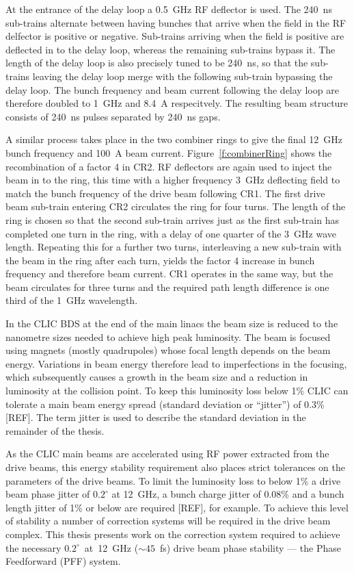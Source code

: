 At the entrance of the delay loop a 0.5~GHz RF deflector is used. The 240~ns sub-trains alternate between having bunches that arrive when the field in the RF delfector is positive or negative. Sub-trains arriving when the field is positive are deflected in to the delay loop, whereas the remaining sub-trains bypass it. The length of the delay loop is also precisely tuned to be 240~ns, so that the sub-trains leaving the delay loop merge with the following sub-train bypassing the delay loop. The bunch frequency and beam current following the delay loop are therefore doubled to 1~GHz and 8.4~A respecitvely. The resulting beam structure consists of 240~ns pulses separated by 240~ns gaps.

A similar process takes place in the two combiner rings to give the final 12~GHz bunch frequency and 100~A beam current. Figure~\ref{f:combinerRing} shows the recombination of a factor 4 in CR2. RF deflectors are again used to inject the beam in to the ring, this time with a higher frequency 3~GHz deflecting field to match the bunch frequency of the drive beam following CR1. The first drive beam sub-train entering CR2 circulates the ring for four turns. The length of the ring is chosen so that the second sub-train arrives just as the first sub-train has completed one turn in the ring, with a delay of one quarter of the 3~GHz wave length. Repeating this for a further two turns, interleaving a new sub-train with the beam in the ring after each turn, yields the factor 4 increase in bunch frequency and therefore beam current. CR1 operates in the same way, but the beam circulates for three turns and the required path length difference is one third of the 1~GHz wavelength.


In the CLIC BDS at the end of the main linacs the beam size is reduced to the nanometre sizes needed to achieve high peak luminosity. The beam is focused using magnets (mostly quadrupoles) whose focal length depends on the beam energy. Variations in beam energy therefore lead to imperfections in the focusing, which subsequently causes a growth in the beam size and a reduction in luminosity at the collision point. To keep this luminosity loss below 1\% CLIC can tolerate a main beam energy spread (standard deviation or ``jitter'') of 0.3\% [REF]. The term jitter is used to describe the standard deviation in the remainder of the thesis. 

As the CLIC main beams are accelerated using RF power extracted from the drive beams, this energy stability requirement also places strict tolerances on the parameters of the drive beams. To limit the luminosity loss to below 1\% a drive beam phase jitter of \(0.2^\circ\) at 12~GHz, a bunch charge jitter of 0.08\% and a bunch length jitter of 1\% or below are required [REF], for example. To achieve this level of stability a number of correction systems will be required in the drive beam complex. This thesis presents work on the correction system required to achieve the necessary \(0.2^\circ\)~at~12~GHz (\(\sim45\)~fs) drive beam phase stability --- the Phase Feedforward (PFF) system.

